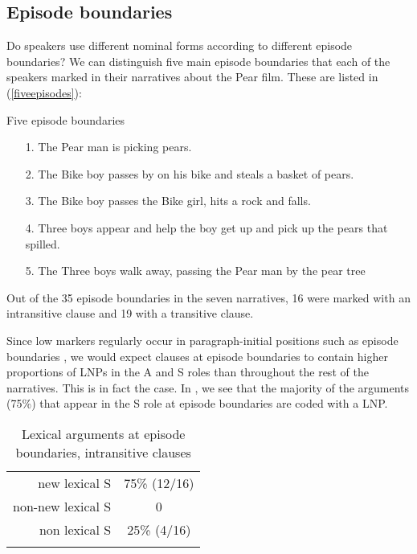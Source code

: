 \subsection{Episode boundaries}\label{episodeboundaries}
\largerpage
Do speakers use different nominal forms according to different episode boundaries? We can distinguish five main episode boundaries that each of the speakers marked in their narratives about the Pear film. These are listed in (\ref{fiveepisodes}):

\ea\label{fiveepisodes} Five episode boundaries
\begin{itemize}
\item[1.] The Pear man is picking pears. 
\item[2.] The Bike boy passes by on his bike and steals a basket of pears. 
\item[3.] The Bike boy passes the Bike girl, hits a rock and falls. 
\item[4.] Three boys appear and help the boy get up and pick up the pears that spilled.
\item[5.] The Three boys walk away, passing the Pear man by the pear tree
\end{itemize}
\z
Out of the 35 episode boundaries in the seven narratives, 16 were marked with an intransitive clause and 19 with a transitive clause.

Since low  markers regularly occur in paragraph-initial positions such as ep\-i\-sode boundaries \citep[52]{ariel2001}, we would expect clauses at episode boundaries to contain higher proportions of LNPs in the A and S roles than throughout the rest of the narratives. This is in fact the case. In , we see that the majority of the arguments (75{\%}) that appear in the S role at episode boundaries are coded with a LNP. 

\begin{table} 

\caption{{Lexical arguments at episode boundaries, intransitive clauses}}
\begin{tabular}{ r  c }
\lsptoprule
new lexical S & 75{\%} (12/16) \\

 
non-new lexical S & 0 \\

 
non lexical S & 25{\%} (4/16)  \\

\lspbottomrule
\end{tabular}\\
\label{episodeintr}

\end{table}

